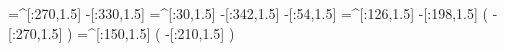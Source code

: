     =^[:270,1.5]%
     -[:330,1.5]%
     =^[:30,1.5]%
     -[:342,1.5]%
      -[:54,1.5]%
    =^[:126,1.5]%
     -[:198,1.5]%
                   (
         -[:270,1.5]%
                   )
    =^[:150,1.5]%
                   (
         -[:210,1.5]%
                   )